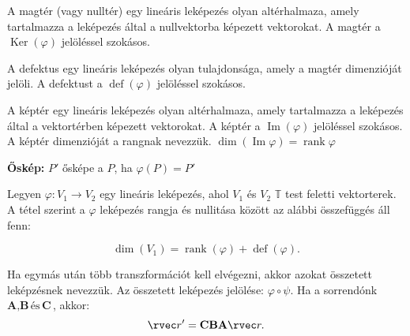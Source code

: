 \documentclass[a4paper, 12pt]{scrartcl}
\begin{document}
\begin{definition}[Magtér]
  A magtér (vagy nulltér) egy lineáris leképezés olyan altérhalmaza, amely tartalmazza a leképezés által a nullvektorba képezett vektorokat. A magtér a $\operatorname{Ker}(\varphi)$ jelöléssel szokásos.

\end{definition}

\begin{definition}[Defektus]
  A defektus egy lineáris leképezés olyan tulajdonsága, amely a magtér dimenzióját jelöli. A defektust a $\operatorname{def}(\varphi)$ jelöléssel szokásos.
\end{definition}

\begin{definition}[Képtér]
  A képtér egy lineáris leképezés olyan altérhalmaza, amely tartalmazza a leképezés által a vektortérben képezett vektorokat. A képtér a $\operatorname{Im}(\varphi)$ jelöléssel szokásos. A képtér dimenzióját a rangnak nevezzük. $\operatorname{dim}(\operatorname{Im}\varphi) = \operatorname{rank}\varphi $
\end{definition}
\begin{note}
  \textbf{Őskép:} $P'$ ősképe a $P$, ha $\varphi(P)=P'$
\end{note}


\begin{theorem}[Rangnullitás]
  Legyen $\varphi: V_1 \to V_2$ egy lineáris leképezés, ahol $V_1$ és $V_2$ $\mathbb{T}$ test feletti vektorterek. A tétel szerint a $\varphi$ leképezés rangja és nullitása között az alábbi összefüggés áll fenn:

  \[
    \dim(V_1) = \operatorname{rank}(\varphi) + \operatorname{def}(\varphi).
  \]

\end{theorem}

\begin{definition}
  Ha egymás után több transzformációt kell elvégezni, akkor azokat összetett leképzésnek nevezzük. Az összetett leképezés jelölése: $\varphi \circ \psi$. Ha a sorrendónk $\textbf{A}, \textbf{B}\, \text{és}\, \textbf{C}$, akkor: $$\rvec r' = \textbf{C}\textbf{B}\textbf{A} \rvec r.$$
\end{definition}

\clearpage
\end{document}
